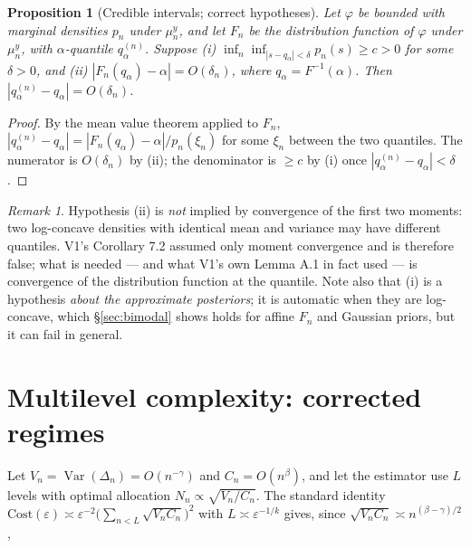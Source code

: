 \documentclass[11pt]{article}
\newtheorem{proposition}[theorem]{Proposition}
\theoremstyle{definition}
\theoremstyle{remark}
\newtheorem{remark}[theorem]{Remark}
\newcommand{\Var}{\operatorname{Var}}
\begin{document}
\begin{proposition}[Credible intervals; correct hypotheses]\label{prop:ci}
Let $\varphi$ be bounded with marginal densities $p_n$ under $\mu^y_n$, and let $F_n$ be the
distribution function of $\varphi$ under $\mu^y_n$, with $\alpha$-quantile $q_\alpha^{(n)}$.
Suppose (i) $\inf_n\inf_{|s-q_\alpha|<\delta}p_n(s)\ge c>0$ for some $\delta>0$, and (ii)
$|F_n(q_\alpha)-\alpha|=O(\delta_n)$, where $q_\alpha=F^{-1}(\alpha)$. Then
$|q_\alpha^{(n)}-q_\alpha|=O(\delta_n)$.
\end{proposition}
\begin{proof}
By the mean value theorem applied to $F_n$,
$|q_\alpha^{(n)}-q_\alpha|=|F_n(q_\alpha)-\alpha|/p_n(\xi_n)$ for some $\xi_n$ between the two
quantiles. The numerator is $O(\delta_n)$ by (ii); the denominator is $\ge c$ by (i) once
$|q_\alpha^{(n)}-q_\alpha|<\delta$.
\end{proof}
\begin{remark}
Hypothesis (ii) is \emph{not} implied by convergence of the first two moments: two log-concave
densities with identical mean and variance may have different quantiles. V1's Corollary 7.2 assumed
only moment convergence and is therefore false; what is needed --- and what V1's own Lemma A.1 in
fact used --- is convergence of the distribution function at the quantile. Note also that (i) is a
hypothesis \emph{about the approximate posteriors}; it is automatic when they are log-concave, which
\S\ref{sec:bimodal} shows holds for affine $F_n$ and Gaussian priors, but it can fail in general.
\end{remark}

\section{Multilevel complexity: corrected regimes}\label{sec:mlmc}
Let $V_n=\Var(\Delta_n)=O(n^{-\gamma})$ and $C_n=O(n^{\beta})$, and let the estimator use $L$ levels
with optimal allocation $N_n\propto\sqrt{V_n/C_n}$. The standard identity
$\mathrm{Cost}(\varepsilon)\asymp\varepsilon^{-2}\bigl(\sum_{n<L}\sqrt{V_nC_n}\bigr)^2$ with
$L\asymp\varepsilon^{-1/k}$ gives, since $\sqrt{V_nC_n}\asymp n^{(\beta-\gamma)/2}$,
\end{document}
